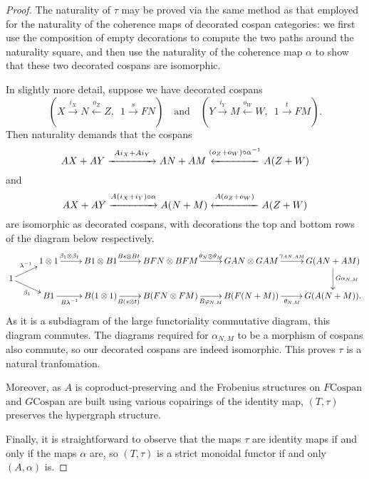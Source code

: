\begin{proof}
The naturality of $\tau$ may be proved via the same method as that employed for
the naturality of the coherence maps of decorated cospan categories: we first
use the composition of empty decorations to compute the two paths around the
naturality square, and then use the naturality of the coherence map $\alpha$ to
show that these two decorated cospans are isomorphic.

In slightly more detail, suppose we have decorated cospans
\[
  (X \stackrel{i_X}\longrightarrow N
  \stackrel{o_Z}\longleftarrow Z,\enspace 1 \stackrel{s}\longrightarrow FN) \quad
  \textrm{and} \quad (Y \stackrel{i_Y}\longrightarrow M
  \stackrel{o_W}\longleftarrow W,\enspace 1 \stackrel{t}\longrightarrow FM).
\]
Then naturality demands that the cospans
\[
  AX+AY \stackrel{Ai_X+Ai_Y}{\xrightarrow{\hspace*{1.5cm}}} AN+AM
  \stackrel{(o_Z+o_W)\circ\alpha^{-1}}{\xleftarrow{\hspace*{1.5cm}}} A(Z+W)
\]
and
\[
  AX+AY \stackrel{A(i_X+i_Y)\circ\alpha}{\xrightarrow{\hspace*{1.5cm}}} A(N+M)
  \stackrel{A(o_Z+o_W)}{\xleftarrow{\hspace*{1.5cm}}} A(Z+W)
\]
are isomorphic as decorated cospans, with decorations the top and bottom rows of
the diagram below respectively.
\[
  \xymatrixrowsep{0.5pc}
  \xymatrix{
    & 1 \otimes 1 \ar[r]^(.4){\beta_1 \otimes \beta_1} & B1 \otimes B1 \ar[r]^(.4){Bs
    \otimes Bt} & BFN \otimes BFM \ar[r]^{\theta_N \otimes \theta_M} & GAN \otimes
    GAM \ar[r]^{\gamma_{AN,AM}} & G(AN+AM) \ar[dd]^{G\alpha_{N,M}} \\
    1 \ar[ur]^{\lambda^{-1}} \ar[dr]_{\beta_1} \\
    & B1 \ar[r]_(.4){B\lambda^{-1}} & B(1 \otimes 1) \ar[r]_(.4){B(s\otimes t)} & B(FN
    \otimes FM) \ar[r]_{B\varphi_{N,M}} & B(F(N+M))
    \ar[r]_{\theta_{N,M}} & G(A(N+M)).
  }
\]
As it is a subdiagram of the large functoriality commutative diagram, this
diagram commutes. The diagrams required for $\alpha_{N,M}$ to be a morphism of
cospans also commute, so our decorated cospans are indeed isomorphic. This
proves $\tau$ is a natural tranfomation.  

Moreover, as $A$ is coproduct-preserving and the Frobenius structures on
$F\mathrm{Cospan}$ and $G\mathrm{Cospan}$ are built using various copairings
of the identity map, $(T,\tau)$ preserves the hypergraph structure.

Finally, it is straightforward to observe that the maps $\tau$ are identity
maps if and only if the maps $\alpha$ are, so $(T,\tau)$ is a strict monoidal
functor if and only $(A,\alpha)$ is.
\end{proof}

